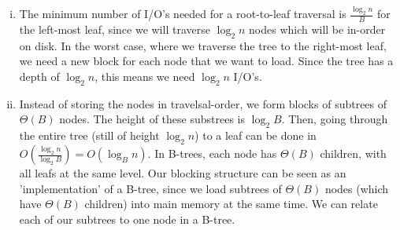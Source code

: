 \begin{enumerate}[(i)]
	\item The minimum number of I/O's needed for a root-to-leaf traversal is $\frac{\log_2{n}}{B}$ for the left-most leaf, since we will traverse $\log_2{n}$ nodes which will be in-order on disk.
		In the worst case, where we traverse the tree to the right-most leaf, we need a new block for each node that we want to load. Since the tree has a depth of $\log_2{n}$, this means we need $\log_2{n}$ I/O's.
	\item Instead of storing the nodes in travelsal-order, we form blocks of subtrees of $\Theta(B)$ nodes. The height of these substrees is $\log_2{B}$.
		Then, going through the entire tree (still of height $\log_2{n}$) to a leaf can be done in $O(\frac{\log_2{n}}{\log_2{B}}) = O(\log_B{n})$.
		In B-trees, each node has $\Theta(B)$ children, with all leafs at the same level.
		Our blocking structure can be seen as an 'implementation' of a B-tree, since we load subtrees of $\Theta(B)$ nodes (which have $\Theta(B)$ children) into main memory at the same time.
		We can relate each of our subtrees to one node in a B-tree.
\end{enumerate}
